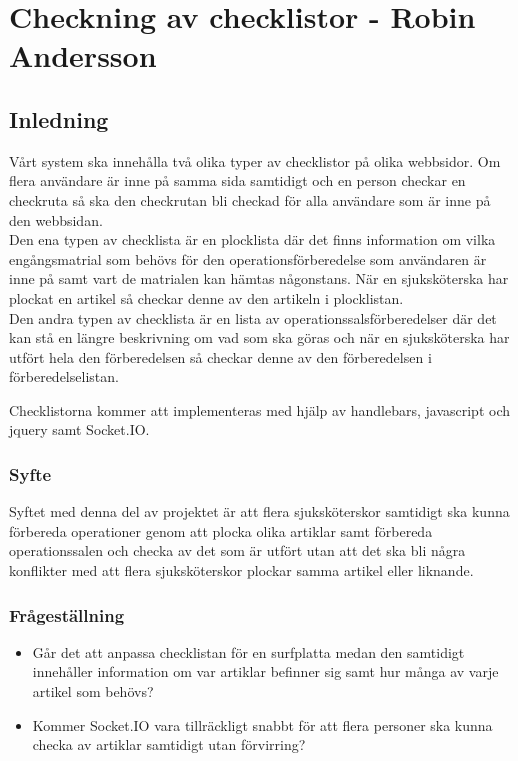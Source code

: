 \section{Checkning av checklistor - Robin Andersson}
\subsection{Inledning}
Vårt system ska innehålla två olika typer av checklistor på olika webbsidor. Om flera användare är inne på samma sida samtidigt och en person checkar en checkruta så ska den checkrutan bli checkad för alla användare som är inne på den webbsidan.\\

Den ena typen av checklista är en plocklista där det finns information om vilka engångsmatrial som behövs för den operationsförberedelse som användaren är inne på samt vart de matrialen kan hämtas någonstans. När en sjuksköterska har plockat en artikel så checkar denne av den artikeln i plocklistan.\\

Den andra typen av checklista är en lista av operationssalsförberedelser där det kan stå en längre beskrivning om vad som ska göras och när en sjuksköterska har utfört hela den förberedelsen så checkar denne av den förberedelsen i förberedelselistan.

Checklistorna kommer att implementeras med hjälp av handlebars, javascript och jquery samt Socket.IO.

\subsubsection{Syfte}
Syftet med denna del av projektet är att flera sjuksköterskor samtidigt ska kunna förbereda operationer genom att plocka olika artiklar samt förbereda operationssalen och checka av det som är utfört utan att det ska bli några konflikter med att flera sjuksköterskor plockar samma artikel eller liknande.

\subsubsection{Frågeställning}
\begin{itemize}
\item Går det att anpassa checklistan för en surfplatta medan den samtidigt innehåller information om var artiklar befinner sig samt hur många av varje artikel som behövs?
\item Kommer Socket.IO vara tillräckligt snabbt för att flera personer ska kunna checka av artiklar samtidigt utan förvirring?
\end{itemize}


